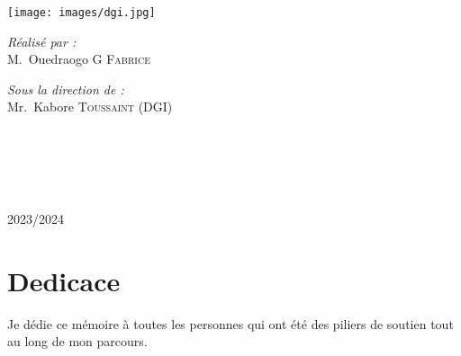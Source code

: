 \documentclass[a4paper,12pt]{report}
\begin{document}
\begin{titlepage}
\begin{center}
\begin{minipage}{2.5cm}
	\begin{center}
		\texttt{[image: images/dgi.jpg]}
	\end{center}

\end{minipage}

\noindent
\begin{minipage}{0.4\textwidth}
  \begin{flushleft} \large
    \emph{\color{orange!80!black}Réalisé par :}\\
    M.~Ouedraogo \textsc{G Fabrice}\\
  \end{flushleft}
\end{minipage}%
\begin{minipage}{0.5\textwidth}
  \begin{flushright} \large
    \emph{\color{orange!80!black}Sous la direction de :} \\
    Mr.~Kabore \textsc{Toussaint} (DGI)
  \end{flushright}
\end{minipage}\\[1cm]

\\[0.5cm]

\color{black}
\centering
\begin{tabular}{lll}

\end{tabular}

\vfill

{\large \color{orange!80!black}{Année universitaire}\\ \color{blue!80!black}2023/2024}
\end{center}
\end{titlepage}
\newpage
\tableofcontents
\newpage


\chapter*{Dedicace}
Je dédie ce mémoire à toutes les personnes qui ont été des piliers de soutien tout au long de mon parcours.
\end{document}
